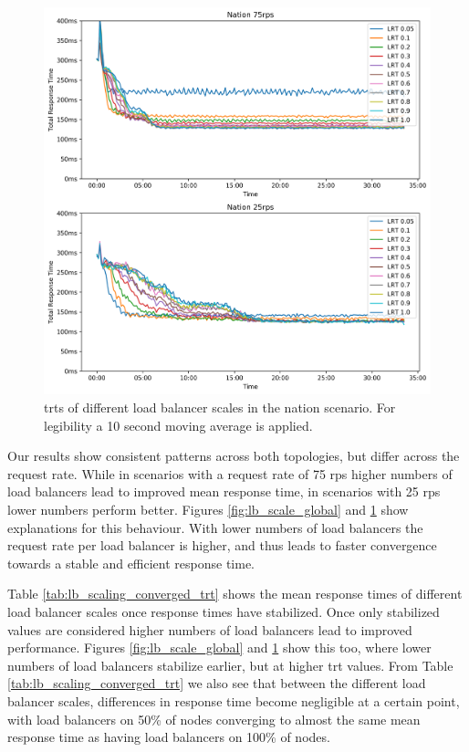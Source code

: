\begin{figure}
    \centering
    \includegraphics[width=\linewidth]{graphics/graphs/nation_lb_scale_corrected.png}
    \caption{\glspl{trt} of different load balancer scales in the nation scenario. For legibility a 10 second moving average is applied.}
    \label{fig:lb_scale_nation}
\end{figure}

Our results show consistent patterns across both topologies, but differ across the request rate.
While in scenarios with a request rate of 75 \gls{rps} higher numbers of load balancers lead to improved mean response time, in scenarios with 25 \gls{rps} lower numbers perform better.
Figures \ref{fig:lb_scale_global} and \ref{fig:lb_scale_nation} show explanations for this behaviour.
With lower numbers of load balancers the request rate per load balancer is higher, and thus leads to faster convergence towards a stable and efficient response time.

Table \ref{tab:lb_scaling_converged_trt} shows the mean response times of different load balancer scales once response times have stabilized.
Once only stabilized values are considered higher numbers of load balancers lead to improved performance.
Figures \ref{fig:lb_scale_global} and \ref{fig:lb_scale_nation} show this too, where lower numbers of load balancers stabilize earlier, but at higher \gls{trt} values.
From Table \ref{tab:lb_scaling_converged_trt} we also see that between the different load balancer scales, differences in response time become negligible at a certain point, with load balancers on 50\% of nodes converging to almost the same mean response time as having load balancers on 100\% of nodes.


